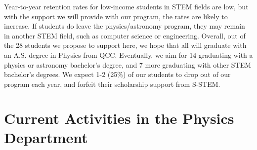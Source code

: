 \documentclass[12pt]{article}
\newcommand\reword[1]{{\color{red}#1}}
\begin{document}

Year-to-year retention rates for low-income students in STEM fields are low, but with the support we will provide with our program, the rates are likely to increase.  If students do leave the physics/astronomy program, they may remain in another STEM field, such as computer science or engineering.  Overall, out of the 28 students we propose to support here, we hope that all will graduate with an A.S. degree in Physics from QCC.  Eventually, we aim for 14 graduating with a physics or astronomy bachelor's degree, and 7 more graduating with other STEM bachelor's degrees.  We expect 1-2 (25\%) of our students to drop out of our program each year, and forfeit their scholarship support from S-STEM.


\section{Current Activities in the Physics Department}
\end{document}
